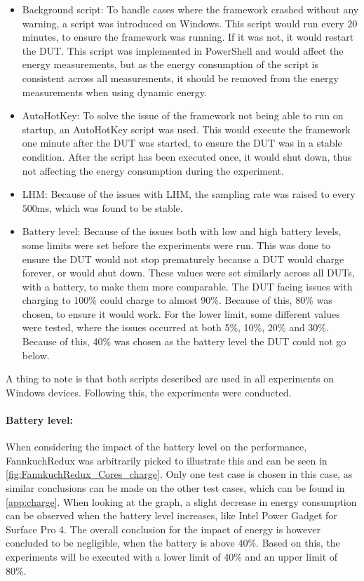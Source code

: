 \begin{itemize}
    \item Background script: To handle cases where the framework crashed without any warning, a script was introduced on Windows. This script would run every 20 minutes, to ensure the framework was running. If it was not, it would restart the DUT. This script was implemented in PowerShell and would affect the energy measurements, but as the energy consumption of the script is consistent across all measurements, it should be removed from the energy measurements when using dynamic energy.
    \item AutoHotKey: To solve the issue of the framework not being able to run on startup, an AutoHotKey script was used. This would execute the framework one minute after the DUT was started, to ensure the DUT was in a stable condition. After the script has been executed once, it would shut down, thus not affecting the energy consumption during the experiment.
    \item LHM: Because of the issues with LHM, the sampling rate was raised to every $500$ms, which was found to be stable.
    \item Battery level: Because of the issues both with low and high battery levels, some limits were set before the experiments were run. This was done to ensure the DUT would not stop prematurely because a DUT would charge forever, or would shut down. These values were set similarly across all DUTs, with a battery, to make them more comparable. The DUT facing issues with charging to 100\% could charge to almost 90\%. Because of this, 80\% was chosen, to ensure it would work. For the lower limit, some different values were tested, where the issues occurred at both 5\%, 10\%, 20\% and 30\%. Because of this, 40\% was chosen as the battery level the DUT could not go below.
\end{itemize}

A thing to note is that both scripts described are used in all experiments on Windows devices. Following this, the experiments were conducted.



\paragraph{Battery level:} When considering the impact of the battery level on the performance, FannkuchRedux was arbitrarily picked to illustrate this and can be seen in \cref{fig:FannkuchRedux_Cores_charge}. Only one test case is chosen in this case, as similar conclusions can be made on the other test cases, which can be found in \cref{app:charge}. When looking at the graph, a slight decrease in energy consumption can be observed when the battery level increases, like Intel Power Gadget for Surface Pro 4. The overall conclusion for the impact of energy is however concluded to be negligible, when the battery is above 40\%. Based on this, the experiments will be executed with a lower limit of 40\% and an upper limit of 80\%.

